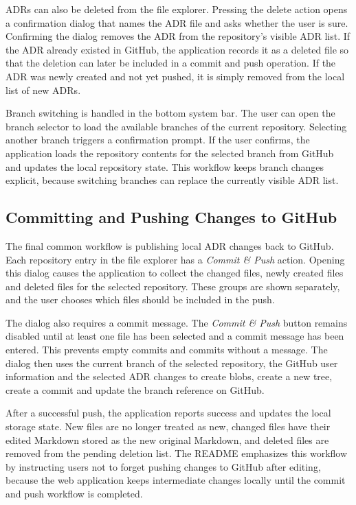 ADRs can also be deleted from the file explorer. Pressing the delete action opens a confirmation dialog that names the ADR file and asks whether the user is sure. Confirming the dialog removes the ADR from the repository's visible ADR list. If the ADR already existed in GitHub, the application records it as a deleted file so that the deletion can later be included in a commit and push operation. If the ADR was newly created and not yet pushed, it is simply removed from the local list of new ADRs.

Branch switching is handled in the bottom system bar. The user can open the branch selector to load the available branches of the current repository. Selecting another branch triggers a confirmation prompt. If the user confirms, the application loads the repository contents for the selected branch from GitHub and updates the local repository state. This workflow keeps branch changes explicit, because switching branches can replace the currently visible ADR list.

\subsection{Committing and Pushing Changes to GitHub}

The final common workflow is publishing local ADR changes back to GitHub. Each repository entry in the file explorer has a \textit{Commit \& Push} action. Opening this dialog causes the application to collect the changed files, newly created files and deleted files for the selected repository. These groups are shown separately, and the user chooses which files should be included in the push.

The dialog also requires a commit message. The \textit{Commit \& Push} button remains disabled until at least one file has been selected and a commit message has been entered. This prevents empty commits and commits without a message. The dialog then uses the current branch of the selected repository, the GitHub user information and the selected ADR changes to create blobs, create a new tree, create a commit and update the branch reference on GitHub.

After a successful push, the application reports success and updates the local storage state. New files are no longer treated as new, changed files have their edited Markdown stored as the new original Markdown, and deleted files are removed from the pending deletion list. The README emphasizes this workflow by instructing users not to forget pushing changes to GitHub after editing, because the web application keeps intermediate changes locally until the commit and push workflow is completed.
